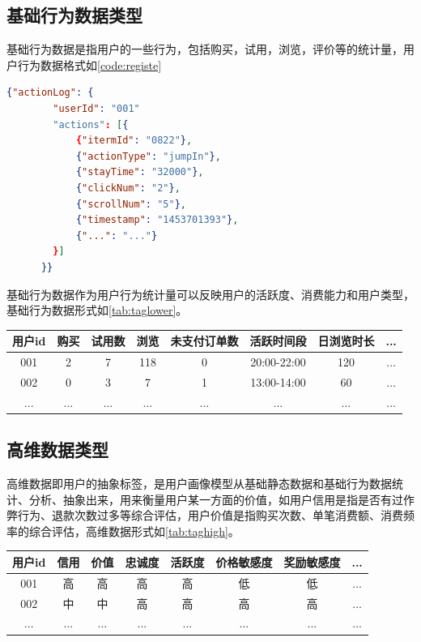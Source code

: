   \subsection{基础行为数据类型}
  基础行为数据是指用户的一些行为，包括购买，试用，浏览，评价等的统计量，用户行为数据格式如\autoref{code:registe}
    \begin{lstlisting}[language=json,firstnumber=1,label={code:registe}]
      {"actionLog": {
        "userId": "001"
        "actions": [{
            {"itermId": "0822"},
            {"actionType": "jumpIn"},
            {"stayTime": "32000"},
            {"clickNum": "2"},
            {"scrollNum": "5"},
            {"timestamp": "1453701393"},
            {"...": "..."}
        }]
      }}
    \end{lstlisting}
  基础行为数据作为用户行为统计量可以反映用户的活跃度、消费能力和用户类型，基础行为数据形式如\autoref{tab:taglower}。
    \begin{table}[htp]
    \centering
    \label{tab:taglower}
    \begin{tabular}{|c|c|c|c|c|c|c|c|} \hline
     用户id & 购买 & 试用数 & 浏览 & 未支付订单数 & 活跃时间段 & 日浏览时长 & ... \\ \hline
     001 & 2 & 7 & 118 & 0 & 20:00-22:00 & 120 & ... \\ \hline
     002 & 0 & 3 & 7 & 1 & 13:00-14:00 & 60 & ... \\ \hline
     ... & ... & ... & ... & ... & ... & ... & ... \\ \hline
    \end{tabular}
    \end{table}

  \subsection{高维数据类型}
  高维数据即用户的抽象标签，是用户画像模型从基础静态数据和基础行为数据统计、分析、抽象出来，用来衡量用户某一方面的价值，如用户信用是指是否有过作弊行为、退款次数过多等综合评估，用户价值是指购买次数、单笔消费额、消费频率的综合评估，高维数据形式如\autoref{tab:taghigh}。
    \begin{table}[htp]
    \centering
    \label{tab:taghigh}
    \begin{tabular}{|c|c|c|c|c|c|c|c|} \hline
     用户id & 信用 & 价值 & 忠诚度 & 活跃度 & 价格敏感度 & 奖励敏感度 & ... \\ \hline
     001 & 高 & 高 & 高 & 高 & 低 & 低 & ... \\ \hline
     002 & 中 & 中 & 高 & 高 & 高 & 高 & ... \\ \hline
     ... & ... & ... & ... & ... & ... & ... & ... \\ \hline
    \end{tabular}
    \end{table}

